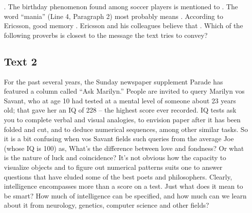 \begin{questions}  .	The birthday phenomenon found among soccer players is mentioned to
 .	The word “mania” (Line 4, Paragraph 2) most probably means
 .	According to Ericsson, good memory
 .	Ericsson and his colleagues believe that
 .	Which of the following proverbs is closest to the message the text tries to convey?
\end{questions}    \subsection{Text 2}
For the past several years, the Sunday newspaper supplement Parade has featured a column called “Ask Marilyn.” People are invited to query Marilyn vos Savant, who at age 10 had tested at a mental level of someone about 23 years old; that gave her an IQ of 228 – the highest score ever recorded. IQ tests ask you to complete verbal and visual analogies, to envision paper after it has been folded and cut, and to deduce numerical sequences, among other similar tasks. So it is a bit confusing when vos Savant fields such queries from the average Joe (whose IQ is 100) as, What’s the difference between love and fondness? Or what is the nature of luck and coincidence? It’s not obvious how the capacity to visualize objects and to figure out numerical patterns suits one to answer questions that have eluded some of the best poets and philosophers.
Clearly, intelligence encompasses more than a score on a test. Just what does it mean to be smart? How much of intelligence can be specified, and how much can we learn about it from neurology, genetics, computer science and other fields?

